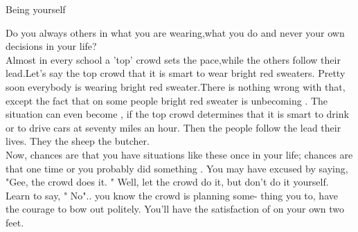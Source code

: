 

\immediate{}
\immediate{}
%
%
\begin{minipage}[b][14cm][t]{\textwidth}
\begin{center}\large{}\end{center}
\begin{center}\Large Being yourself\end{center}
\begin{large}
Do you always  others in what you are wearing,what you do and never  your own decisions in your life?\\[3pt]
Almost in every school a 'top' crowd sets the pace,while the others follow their lead.Let's say the top crowd  that it is smart to wear bright red sweaters. Pretty soon everybody is wearing  bright red sweater.There is nothing wrong with that, except the fact that on some people bright red sweater is  unbecoming . The situation can even become , if the top crowd determines that it is smart to drink or to drive cars at seventy miles an hour. Then the people  follow the lead  their lives. They  the sheep   the butcher.\\[3pt]
Now, chances are that you have  situations like these
 once in your life; chances are that one time or  you probably did something . You may have excused  by saying, "Gee, the crowd does it. " Well, let the crowd do it, but don't do it yourself. Learn to say, " No"..  you know the crowd is planning some- thing you  to, have the courage to bow  out politely. You'll have the satisfaction of  on your own two feet.
\end{large}
\end{minipage}
